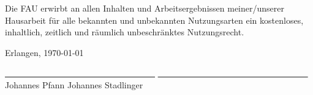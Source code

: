Die FAU erwirbt an allen Inhalten und Arbeitsergebnissen meiner/unserer
Hausarbeit f\"ur alle bekannten und unbekannten Nutzungsarten ein kostenloses,
inhaltlich, zeitlich und r\"aumlich unbeschr\"anktes Nutzungsrecht.


\vspace{2em}

\noindent
Erlangen, \today


\vspace{2em}
\noindent\underline{\ \ \ \ \ \ \ \ \ \ \ \ \ \ \ \ \ \ \ \ \ \ \ \ \
	\ \ \ \ \ \ \ \ \ \
} \hfill \underline{\ \ \ \ \ \ \ \ \ \ \ \ \ \ \ \ \ \ \ \ \ \ \ \ \
	\ \ \ \ \ \ \ \ \ \
}\\
\noindent\small{Johannes Pfann} \hfill
\small{Johannes Stadlinger}
